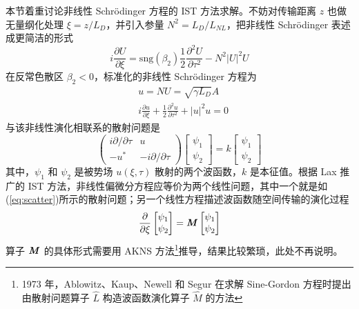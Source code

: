 本节着重讨论非线性 Schr\"odinger 方程的 IST 方法求解。不妨对传输距离 $z$ 也做无量纲化处理 $\xi=z/L_D$，并引入参量 $N^2=L_{D}/L_{NL}$，把非线性 Schr\"odinger 表述成更简洁的形式
\begin{equation}
    i\frac{\partial U}{\partial \xi}=\mathrm{sng}(\beta_2)\frac{1}{2}\frac{\partial^2 U}{\partial \tau^2}-N^2|U|^2U
\end{equation}
在反常色散区 $\beta_2<0$，标准化的非线性 Schr\"odinger 方程为
\begin{align}
    &u=NU=\sqrt{\gamma L_D} A\nonumber \\
    &i\frac{\partial u}{\partial \xi}+\frac{1}{2}\frac{\partial^2 u}{\partial \tau^2}+|u|^2u=0
    \label{eq:NLSE}
\end{align}
与该非线性演化相联系的散射问题是\cite{guoyucui}
\begin{equation}
    \begin{pmatrix}
        i\partial/\partial \tau & u \\
        -u^* & -i\partial/\partial \tau
    \end{pmatrix}\begin{bmatrix}
        \psi_1\\
        \psi_2
    \end{bmatrix}=k\begin{bmatrix}
        \psi_1\\
        \psi_2
    \end{bmatrix}
    \label{eq:scatter}
\end{equation}
其中，$\psi_1$ 和 $\psi_2$ 是被势场 $u(\xi,\tau)$ 散射的两个波函数，$k$ 是本征值。根据 Lax 推广的 IST 方法，非线性偏微分方程应等价为两个线性问题，其中一个就是如(\ref{eq:scatter})所示的散射问题；另一个线性方程描述波函数随空间传输的演化过程
\begin{equation}
    \frac{\partial}{\partial \xi}\begin{bmatrix}
        \psi_1\\
        \psi_2
    \end{bmatrix}=\textbf{\textit{M}}\begin{bmatrix}
        \psi_1\\
        \psi_2
    \end{bmatrix}
    \label{eq:wave function evolution}
\end{equation}
算子 $\textbf{\textit{M}}$ 的具体形式需要用 AKNS 方法\footnote{1973 年，Ablowitz、Kaup、Newell 和 Segur 在求解 Sine-Gordon 方程时提出由散射问题算子 $\hat{L}$ 构造波函数演化算子 $\hat{M}$ 的方法}推导\cite{guoyucui}，结果比较繁琐，此处不再说明。

